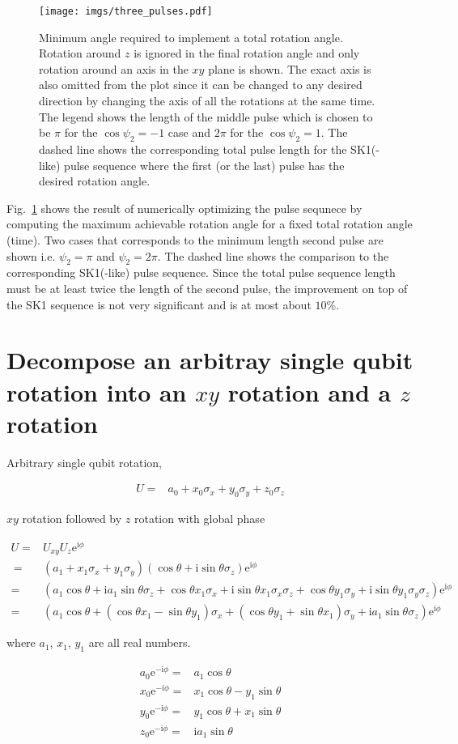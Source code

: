 \documentclass[10pt,fleqn]{article}
\newcommand{\ue}{\mathrm{e}}
\newcommand{\ui}{\mathrm{i}}
\newcommand{\eqar}[1]
{
  \begin{align*}
    #1
  \end{align*}
}
\newcommand{\paren}[1]{{\left({#1}\right)}}
\begin{document}
\begin{figure}[h]
  \centering
  \texttt{[image: imgs/three\_pulses.pdf]}
  \caption{Minimum angle required to implement a total rotation angle.
    Rotation around $z$ is ignored in the final rotation angle and only rotation
    around an axis in the $xy$ plane is shown.
    The exact axis is also omitted from the plot since it can be changed to any
    desired direction by changing the axis of all the rotations at the same time.
    The legend shows the length of the middle pulse which is chosen to be $\pi$
    for the $\cos\psi_2=-1$ case and $2\pi$ for the $\cos\psi_2=1$.
    The dashed line shows the corresponding total pulse length for the SK1(-like)
    pulse sequence where the first (or the last) pulse
    has the desired rotation angle.}
  \label{fig:three-pulses}
\end{figure}

Fig.~\ref{fig:three-pulses} shows the result of numerically optimizing
the pulse sequnece by computing the maximum achievable rotation angle
for a fixed total rotation angle (time). Two cases that corresponds to
the minimum length second pulse are shown i.e. $\psi_2=\pi$ and $\psi_2=2\pi$.
The dashed line shows the comparison to the corresponding SK1(-like) pulse sequence.
Since the total pulse sequence length must be at least
twice the length of the second pulse, the improvement on top of the SK1 sequence
is not very significant and is at most about $10\%$.

\clearpage
\appendix
\section{Decompose an arbitray single qubit rotation into an $xy$ rotation
  and a $z$ rotation}

Arbitrary single qubit rotation,
\eqar{
  U=&a_0 + x_0 \sigma_x + y_0 \sigma_y + z_0 \sigma_z
}
$xy$ rotation followed by $z$ rotation with global phase
\eqar{
  U=&U_{xy} U_z\ue^{\ui\phi}\\\
  =&\paren{a_1 + x_1 \sigma_x + y_1 \sigma_y}\paren{\cos\theta + \ui\sin\theta\sigma_z}\ue^{\ui\phi}\\
  =&\paren{a_1\cos\theta + \ui a_1\sin\theta \sigma_z + \cos\theta x_1 \sigma_x + \ui\sin\theta x_1 \sigma_x\sigma_z + \cos\theta y_1 \sigma_y + \ui\sin\theta y_1 \sigma_y\sigma_z}\ue^{\ui\phi}\\
  =&\paren{a_1\cos\theta + \paren{\cos\theta x_1 - \sin\theta y_1} \sigma_x + \paren{\cos\theta y_1 + \sin\theta x_1} \sigma_y + \ui a_1\sin\theta \sigma_z}\ue^{\ui\phi}
}
where $a_1$, $x_1$, $y_1$ are all real numbers.
\eqar{
  a_0\ue^{-\ui\phi}=&a_1\cos\theta\\
  x_0\ue^{-\ui\phi}=&x_1\cos\theta - y_1\sin\theta\\
  y_0\ue^{-\ui\phi}=&y_1\cos\theta + x_1\sin\theta\\
  z_0\ue^{-\ui\phi}=&\ui a_1\sin\theta
}
\end{document}

